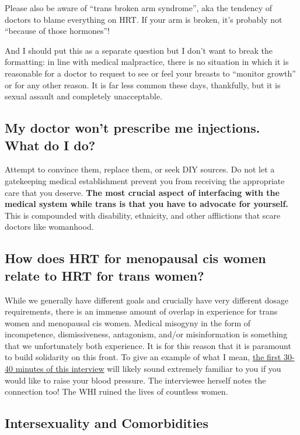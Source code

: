 \documentclass{article}
\begin{document}
Please also be aware of “trans broken arm syndrome”, aka the tendency of doctors to blame everything on HRT. If your arm is broken, it's probably not “because of those hormones”!

And I should put this as a separate question but I don't want to break the formatting: in line with medical malpractice, there is no situation in which it is reasonable for a doctor to request to see or feel your breasts to “monitor growth” or for any other reason. It is far less common these days, thankfully, but it is sexual assault and completely unacceptable.

\subsection{My doctor won’t prescribe me injections. What do I do?}

Attempt to convince them, replace them, or seek DIY sources. Do not let a gatekeeping medical establishment prevent you from receiving the appropriate care that you deserve. \textbf{The most crucial aspect of interfacing with the medical system while trans is that you have to advocate for yourself. }This is compounded with disability, ethnicity, and other afflictions that scare doctors like womanhood.

\subsection{How does HRT for menopausal cis women relate to HRT for trans women?}\label{11-29}

While we generally have different goals and crucially have very different dosage requirements, there is an immense amount of overlap in experience for trans women and menopausal cis women. Medical misogyny in the form of incompetence, dismissiveness, antagonism, and/or misinformation is something that we unfortunately both experience. It is for this reason that it is paramount to build solidarity on this front. To give an example of what I mean, \href{https://www.youtube.com/watch?v=W0XW6av2wLQ}{the first 30-40 minutes of this interview} will likely sound extremely familiar to you if you would like to raise your blood pressure. The interviewee herself notes the connection too! The WHI ruined the lives of countless women.

\subsection*{Intersexuality and Comorbidities}
\end{document}
